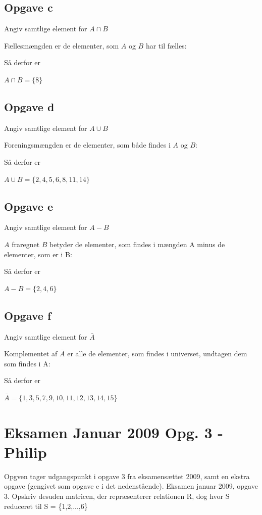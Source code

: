 \documentclass{article}
\begin{document}
\subsection*{Opgave c}
Angiv samtlige element for $A \cap B$

Fællesmængden er de elementer, som $A$ og $B$ har til fælles:

Så derfor er

\begin{center}
$A \cap B = \{ 8 \}$  
\end{center}

\subsection*{Opgave d}
Angiv samtlige element for $A \cup B$

Foreningsmængden er de elementer, som både findes i $A$ og $B$:

Så derfor er

\begin{center}
$A \cup B = \{ 2, 4, 5, 6, 8, 11, 14 \}$  
\end{center}

\subsection*{Opgave e}
Angiv samtlige element for $A - B$

$A$ fraregnet $B$ betyder de elementer, som findes i mængden A minus de elementer, som er i B:

Så derfor er

\begin{center}
$A - B = \{ 2, 4, 6 \}$  
\end{center}

\subsection*{Opgave f}
Angiv samtlige element for $\bar{A}$

Komplementet af $\bar{A}$ er alle de elementer, som findes i universet, undtagen dem som findes i A:

Så derfor er

\begin{center}
$\bar{A} = \{ 1, 3, 5, 7, 9, 10, 11, 12, 13, 14, 15 \}$  
\end{center}

\section{Eksamen Januar 2009 Opg. 3 - Philip}
Opgven tager udgangspunkt i opgave 3 fra eksamensættet 2009, samt en ekstra opgave (gengivet som opgave c i det nedenstående).
Eksamen januar 2009, opgave 3. Opskriv desuden matricen, der repræsenterer relationen R, dog hvor S reduceret til S = \{1,2,...,6\} 
\end{document}
